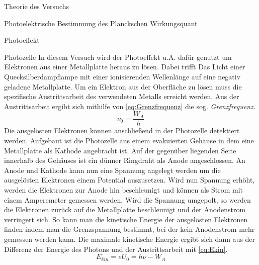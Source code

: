 \documentclass[pdftex, a4paper,11pt, twoside, ngerman]{report}
\begin{document}
\begin{chapter}{Theorie des Versuchs}
\begin{section}{Photoelektrische Bestimmung des Planckschen Wirkungsquant}
\begin{subsection}{Photoeffekt}
      \end{subsection}
      
      
      
      \begin{subsection}{Photozelle}
        \label{chp:TheoriePhotoelektrischesWirkungsquantumPhotozelle}
        In diesem Versuch wird der Photoeffekt u.A. dafür genutzt um Elektronen
        aus einer Metallplatte heraus zu lösen. Dabei trifft Das Licht einer 
        Quecksilberdampflampe mit einer ionisierenden Wellenlänge auf eine 
        negativ geladene Metallplatte. Um ein Elektron aus der Oberfläche zu 
        lösen muss die spezifische Austrittsarbeit des verwendeten Metalls 
        erreicht werden. Aus der Austrittsarbeit ergibt sich mithilfe von 
        \cref{eq:Grenzfrequenz} die sog. \textit{Grenzfrequenz}.
        \begin{equation}
          \label{eq:Grenzfrequenz}
          \nu_{0}=\frac{W_{A}}{h}
        \end{equation}
        Die ausgelösten Elektronen können anschließend in der Photozelle
        detektiert werden. Aufgebaut ist die Photozelle aus einem evakuierten 
        Gehäuse in dem eine Metallplatte als Kathode angebracht ist. Auf der 
        gegenüber liegenden Seite innerhalb des Gehäuses ist ein dünner 
        Ringdraht als Anode angeschlossen. An Anode und Kathode kann nun eine 
        Spannung angelegt werden um die ausgelösten Elektronen einem Potential 
        auszusetzen. Wird nun Spannung erhöht, werden die Elektronen zur Anode 
        hin beschleunigt und können als Strom mit einem Amperemeter gemessen 
        werden. Wird die Spannung umgepolt, so werden die Elektronen zurück 
        auf die Metallplatte beschleunigt und der Anodenstrom verringert sich. 
        So kann man die kinetische Energie der ausgelösten Elektronen finden 
        indem man die Grenzspannung bestimmt, bei der kein Anodenstrom mehr 
        gemessen werden kann. Die maximale kinetische Energie ergibt sich dann 
        aus der Differenz der Energie des Photons und der Austrittsarbeit mit 
        \cref{eq:Ekin}.
        \begin{equation}
          \label{eq:Ekin}
          E_{kin}=eU_{0}=h\nu-W_{A}
        \end{equation}
        

\end{subsection}
\end{section}
\end{chapter}
\end{document}
